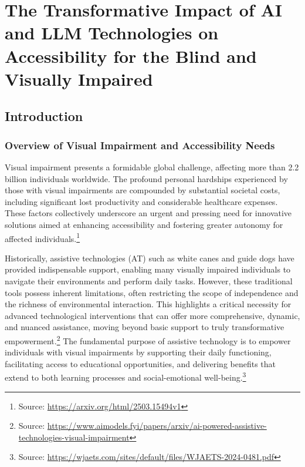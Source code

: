 \chapter{The Transformative Impact of AI and LLM Technologies on Accessibility for the Blind and Visually Impaired}

\section{Introduction}

\subsection{Overview of Visual Impairment and Accessibility Needs}

Visual impairment presents a formidable global challenge, affecting more than 2.2 billion individuals worldwide. The profound personal hardships experienced by those with visual impairments are compounded by substantial societal costs, including significant lost productivity and considerable healthcare expenses. These factors collectively underscore an urgent and pressing need for innovative solutions aimed at enhancing accessibility and fostering greater autonomy for affected individuals.\footnote{Source: \url{https://arxiv.org/html/2503.15494v1}}

Historically, assistive technologies (AT) such as white canes and guide dogs have provided indispensable support, enabling many visually impaired individuals to navigate their environments and perform daily tasks. However, these traditional tools possess inherent limitations, often restricting the scope of independence and the richness of environmental interaction. This highlights a critical necessity for advanced technological interventions that can offer more comprehensive, dynamic, and nuanced assistance, moving beyond basic support to truly transformative empowerment.\footnote{Source: \url{https://www.aimodels.fyi/papers/arxiv/ai-powered-assistive-technologies-visual-impairment}} The fundamental purpose of assistive technology is to empower individuals with visual impairments by supporting their daily functioning, facilitating access to educational opportunities, and delivering benefits that extend to both learning processes and social-emotional well-being.\footnote{Source: \url{https://wjaets.com/sites/default/files/WJAETS-2024-0481.pdf}}

